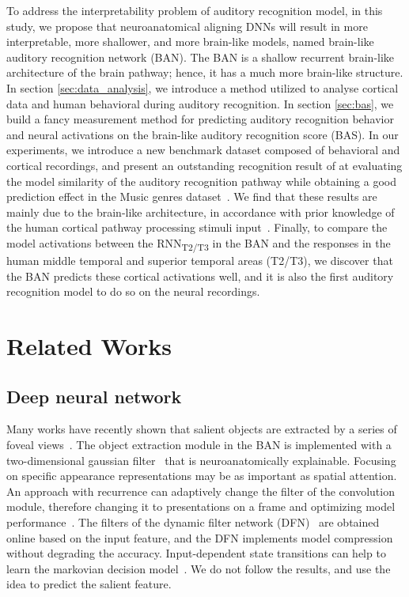 \documentclass[journal]{IEEEtran}
\begin{document}
To address the interpretability problem of auditory recognition model, in this study, we propose that neuroanatomical aligning DNNs will result in more interpretable, more shallower, and more brain-like models, named brain-like auditory recognition network (BAN).
The BAN is a shallow recurrent brain-like architecture of the brain pathway; 
hence, it has a much more brain-like structure. 
In section \ref{sec:data_analysis}, we introduce a method utilized to analyse cortical data and human behavioral during auditory recognition. 
In section \ref{sec:bas}, we build a fancy measurement method for predicting auditory recognition behavior and neural activations on the brain-like auditory recognition score (BAS). 
In our experiments, we introduce a new benchmark dataset composed of behavioral and cortical recordings, 
and present an outstanding recognition result of at evaluating the model similarity of the auditory recognition pathway while obtaining a good prediction effect in the Music genres dataset~\cite{nakai2022music}. 
We find that these results are mainly due to the brain-like architecture, in accordance with prior knowledge of the human cortical pathway processing stimuli input~\cite{TangSchrimpfLotter2018Recurrent, yin2020deep, kar2019evidence}. 
Finally, to compare the model activations between the RNN\textsubscript{T2/T3} in the BAN and the responses in the human middle temporal and superior temporal areas (T2/T3), we discover that the BAN predicts these cortical activations well, 
and it is also the first auditory recognition model to do so on the neural recordings. 


\section{Related Works} 

\subsection{Deep neural network}\par
Many works have recently shown that salient objects are extracted by a series of foveal views~\cite{mnih2014recurrent,draw}.
The object extraction module in the BAN is implemented with a two-dimensional gaussian filter~\cite{RATM} that is neuroanatomically explainable.
Focusing on specific appearance representations may be as important as spatial attention. 
An approach with recurrence can adaptively change the filter of the convolution module, therefore changing it to presentations on a frame and optimizing model performance~\cite{stollenga2014deep}. 
The filters of the dynamic filter network (DFN)~\cite{brabandere2016dynamic} are obtained online based on the input feature, and the DFN implements model compression without degrading the accuracy. 
Input-dependent state transitions can help to learn the markovian decision model~\cite{karl2017deep}. 
We do not follow the results, and use the idea to predict the salient feature. 
\end{document}
